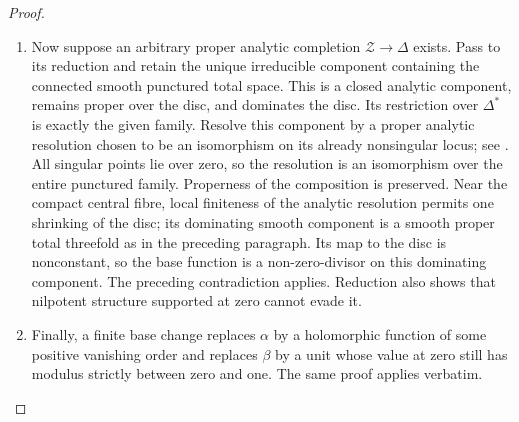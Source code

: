 \begin{proof}
\begin{enumerate}[label=\arabic*.,leftmargin=*]
\item Now suppose an arbitrary proper analytic completion
$\mathcal Z\to\Delta$ exists. Pass to its reduction
and retain the unique irreducible component containing
the connected smooth punctured total space. This is a
closed analytic component, remains proper over the
disc, and dominates the disc. Its restriction over
$\Delta^*$ is exactly the given family. Resolve this
component by a proper analytic resolution chosen to
be an isomorphism on its already nonsingular locus;
see \citet[Theorem~1.6 and the following noncompact extension, p.~215]{BM97}.
All singular points lie over zero, so the resolution
is an isomorphism over the entire punctured family.
Properness of the composition is preserved. Near the
compact central fibre, local finiteness of the
analytic resolution permits one shrinking of the
disc; its dominating smooth component is a smooth
proper total threefold as in the preceding paragraph.
Its map to the disc is nonconstant, so the base
function is a non-zero-divisor on this dominating component.
The preceding contradiction applies. Reduction also
shows that nilpotent structure supported at zero
cannot evade it.

\item Finally, a finite base change replaces $\alpha$ by
a holomorphic function of some positive vanishing
order and replaces $\beta$ by a unit whose value
at zero still has modulus strictly between zero and
one. The same proof applies verbatim.
\end{enumerate}
\end{proof}